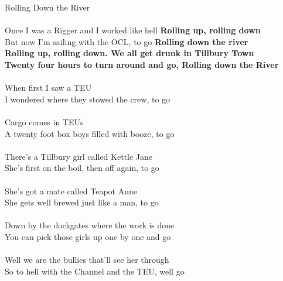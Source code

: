 \documentclass[letterpaper,9pt]{article}
\begin{document}
\newpage
{}
\huge
Rolling Down the River\\
\\
\LARGE
\noindent
Once I was a Rigger and I worked like hell \textbf{Rolling up, rolling down}
\\But now I'm sailing with the OCL, to go \textbf{Rolling down the river
\\Rolling up, rolling down. We all get drunk in Tillbury Town
\\Twenty four hours to turn around and go, Rolling down the River}
\\
\\When first I saw a TEU
\\I wondered where they stowed the crew, to go
\\
\\Cargo comes in TEUs
\\A twenty foot box boys filled with booze, to go
\\
\\There's a Tillbury girl called Kettle Jane
\\She's first on the boil, then off again, to go
\\
\\She's got a mate called Teapot Anne
\\She gets well brewed just like a man, to go
\\
\\Down by the dockgates where the work is done
\\You can pick those girls up one by one and go
\\
\\Well we are the bullies that'll see her through
\\So to hell with the Channel and the TEU, well go
\end{document}
